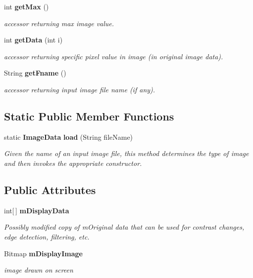 \begin{CompactItemize}
int {\bf get\-Max} ()
\begin{CompactList}\small\item\em accessor returning max image value. \item\end{CompactList}\item 
int {\bf get\-Data} (int i)
\begin{CompactList}\small\item\em accessor returning specific pixel value in image (in original image data). \item\end{CompactList}\item 
String {\bf get\-Fname} ()
\begin{CompactList}\small\item\em accessor returning input image file name (if any). \item\end{CompactList}\end{CompactItemize}
\subsection*{Static Public Member Functions}
\begin{CompactItemize}
\item 
static {\bf Image\-Data} {\bf load} (String file\-Name)
\begin{CompactList}\small\item\em Given the name of an input image file, this method determines the type of image and then invokes the appropriate constructor. \item\end{CompactList}\end{CompactItemize}
\subsection*{Public Attributes}
\begin{CompactItemize}
\item 
int[$\,$] {\bf m\-Display\-Data}
\begin{CompactList}\small\item\em Possibly modified copy of m\-Original data that can be used for contrast changes, edge detection, filtering, etc. \item\end{CompactList}\item 
Bitmap {\bf m\-Display\-Image}
\begin{CompactList}\small\item\em image drawn on screen \item\end{CompactList}\end{CompactItemize}
